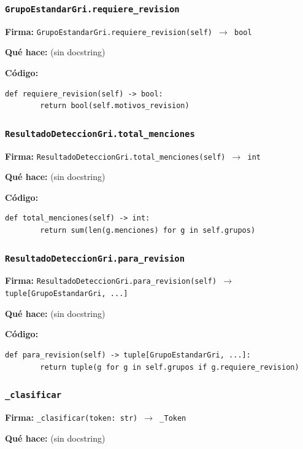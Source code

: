 \documentclass[11pt,a4paper]{article}
\begin{document}
\subsubsection*{\texttt{GrupoEstandarGri.requiere\_revision}}
\textbf{Firma:} \texttt{GrupoEstandarGri.requiere\_revision(self) $\rightarrow$ bool}

\textbf{Qué hace:} (sin docstring)

\textbf{Código:}
\begin{lstlisting}
def requiere_revision(self) -> bool:
        return bool(self.motivos_revision)
\end{lstlisting}

\subsubsection*{\texttt{ResultadoDeteccionGri.total\_menciones}}
\textbf{Firma:} \texttt{ResultadoDeteccionGri.total\_menciones(self) $\rightarrow$ int}

\textbf{Qué hace:} (sin docstring)

\textbf{Código:}
\begin{lstlisting}
def total_menciones(self) -> int:
        return sum(len(g.menciones) for g in self.grupos)
\end{lstlisting}

\subsubsection*{\texttt{ResultadoDeteccionGri.para\_revision}}
\textbf{Firma:} \texttt{ResultadoDeteccionGri.para\_revision(self) $\rightarrow$ tuple[GrupoEstandarGri, ...]}

\textbf{Qué hace:} (sin docstring)

\textbf{Código:}
\begin{lstlisting}
def para_revision(self) -> tuple[GrupoEstandarGri, ...]:
        return tuple(g for g in self.grupos if g.requiere_revision)
\end{lstlisting}

\subsubsection*{\texttt{\_clasificar}}
\textbf{Firma:} \texttt{\_clasificar(token: str) $\rightarrow$ \_Token}

\textbf{Qué hace:} (sin docstring)
\end{document}
